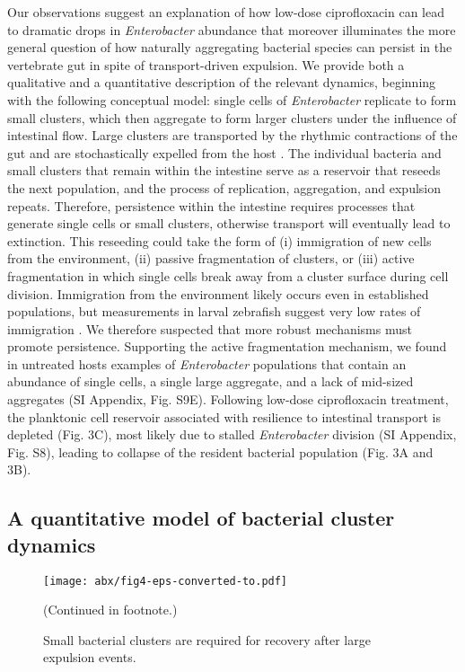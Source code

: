 Our observations suggest an explanation of how low-dose ciprofloxacin can lead to dramatic drops in \textit{Enterobacter} abundance that moreover illuminates the more general question of how naturally aggregating bacterial species can persist in the vertebrate gut in spite of transport-driven expulsion. We provide both a qualitative and a quantitative description of the relevant dynamics, beginning with the following conceptual model: single cells of \textit{Enterobacter}  replicate to form small clusters, which then aggregate to form larger clusters under the influence of intestinal flow. Large clusters are transported by the rhythmic contractions of the gut \cite{wiles_host_2016,Logan2018,ganz2018} and are stochastically expelled from the host \cite{wiles_host_2016,Logan2018}. The individual bacteria and small clusters that remain within the intestine serve as a reservoir that reseeds the next population, and the process of replication, aggregation, and expulsion repeats. Therefore, persistence  within the intestine requires processes that generate single cells or small clusters, otherwise transport will eventually lead to extinction. This reseeding could take the form of (i) immigration of new cells from the environment, (ii) passive fragmentation of  clusters, or (iii) active fragmentation in which single cells break away from a cluster surface during cell division. Immigration from the environment likely occurs even in established populations, but measurements in larval zebrafish suggest very low rates of immigration \cite{robinson_experimental_2018}. We therefore suspected that more robust mechanisms must promote persistence. Supporting the active fragmentation mechanism, we found in untreated hosts examples of \textit{Enterobacter} populations that contain an abundance of single cells, a single large aggregate, and a lack of mid-sized aggregates (SI Appendix, Fig. S9E). Following low-dose ciprofloxacin treatment, the planktonic cell reservoir associated with resilience to intestinal transport is depleted (Fig. 3C), most likely due to stalled \textit{Enterobacter} division (SI Appendix, Fig. S8), leading to collapse of the resident bacterial population (Fig. 3A and 3B).




 \subsection{A quantitative model of bacterial cluster dynamics}

\begin{figure}%
\centerline{
	\texttt{[image: abx/fig4-eps-converted-to.pdf]}}
	\caption{Small bacterial clusters are required for recovery after large expulsion events.}{(Continued in footnote.)}  
	\label{fig:fig4}
\end{figure}

